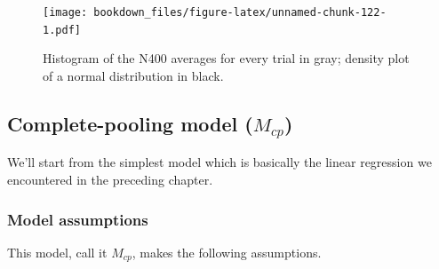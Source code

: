 \documentclass[12pt,]{krantz}
\newenvironment{Shaded}{\begin{snugshade}}{\end{snugshade}}
\newcommand{\DataTypeTok}[1]{\textcolor[rgb]{0.13,0.29,0.53}{#1}}
\newcommand{\DecValTok}[1]{\textcolor[rgb]{0.00,0.00,0.81}{#1}}
\newcommand{\FloatTok}[1]{\textcolor[rgb]{0.00,0.00,0.81}{#1}}
\newcommand{\KeywordTok}[1]{\textcolor[rgb]{0.13,0.29,0.53}{\textbf{#1}}}
\newcommand{\NormalTok}[1]{#1}
\newcommand{\OperatorTok}[1]{\textcolor[rgb]{0.81,0.36,0.00}{\textbf{#1}}}
\newcommand{\StringTok}[1]{\textcolor[rgb]{0.31,0.60,0.02}{#1}}
\theoremstyle{definition}
\theoremstyle{definition}
\theoremstyle{definition}
\theoremstyle{remark}
\begin{document}
\begin{Shaded}
\end{Shaded}

\begin{figure}
\centering
\texttt{[image: bookdown\_files/figure-latex/unnamed-chunk-122-1.pdf]}
\caption{\label{fig:unnamed-chunk-122}Histogram of the N400 averages for every trial in gray; density plot of a normal distribution in black.}
\end{figure}

\hypertarget{complete-pooling-model-m_cp}{%
\subsection{\texorpdfstring{Complete-pooling model (\(M_{cp}\))}{Complete-pooling model (M\_\{cp\})}}\label{complete-pooling-model-m_cp}}

We'll start from the simplest model which is basically the linear regression we encountered in the preceding chapter.

\hypertarget{model-assumptions}{%
\subsubsection{Model assumptions}\label{model-assumptions}}

This model, call it \(M_{cp}\), makes the following assumptions.
\end{document}
